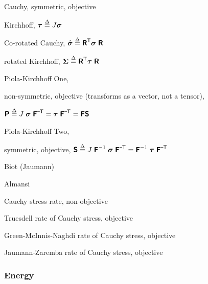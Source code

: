 \begin{description}[noitemsep,align=right,labelwidth=1.5cm,labelsep=0.8cm]
\item [$\ve{\sigma}$] Cauchy, symmetric, objective
\item [$\ve{\tau}$] Kirchhoff, 
$\mbox{\boldmath $\tau$} \stackrel{\Delta}{=} J \mbox{\boldmath $\sigma$}$
\item 
\item [$\hat{\ve{\sigma}}$] Co-rotated Cauchy,
$\hat{\mbox{\boldmath $\sigma$}} \stackrel{\Delta}{=} \mbox{\sffamily\bfseries R}^{\mbox{\scriptsize \sffamily T}} \mbox{\boldmath $\sigma$} \; \mbox{\sffamily\bfseries R}$
\item [$\ve{\Sigma}$] rotated Kirchhoff, 
$\mbox{\boldmath $\Sigma$} \stackrel{\Delta}{=} \mbox{\sffamily\bfseries R}^{\mbox{\scriptsize \sffamily T}} \mbox{\boldmath $\tau$} \; \mbox{\sffamily\bfseries R}$
\item 
\item [$\tPbold$] Piola-Kirchhoff One, 
\item [] non-symmetric, objective (transforms as
a vector, not a tensor), 
\item [] 
$\mbox{\sffamily\bfseries P} \stackrel{\Delta}{=} J \; \mbox{\boldmath $\sigma$}\;\mbox{\sffamily\bfseries F}^{\mbox{\scriptsize \sffamily --T}} = \mbox{\boldmath $\tau$}\; \mbox{\sffamily\bfseries F}^{\mbox{\scriptsize \sffamily --T}} = \mbox{\sffamily\bfseries F} \mbox{\sffamily\bfseries S}$
\item 
\item [$\tSbold$] Piola-Kirchhoff Two, 
\item [] symmetric, objective,
$\mbox{\sffamily\bfseries S} \stackrel{\Delta}{=} J \; \mbox{\sffamily\bfseries F}^{-1} \;\mbox{\boldmath $\sigma$}\; \mbox{\sffamily\bfseries F}^{\mbox{\scriptsize \sffamily --T}} = \mbox{\sffamily\bfseries F}^{-1} \;\mbox{\boldmath $\tau$}\; \mbox{\sffamily\bfseries F}^{\mbox{\scriptsize \sffamily --T}}$
\item 
\item [$\tBbold$] Biot (Jaumann)
\item [$\tAbold$] Almansi
\item 
\item [$\dot{\ve{\sigma}}$] Cauchy stress rate, non-objective
\item 
\item [$\overset{\circ}{\ve{\sigma}}$] Truesdell rate of Cauchy stress, objective
\item 
\item [$\overset{\square}{\ve{\sigma}}$] Green-McInnis-Naghdi rate of Cauchy stress, objective
\item 
\item [$\overset{\triangledown}{\ve{\sigma}}$] Jaumann-Zaremba rate of Cauchy stress, objective
\item
\end{description}


\subsubsection*{Energy}

